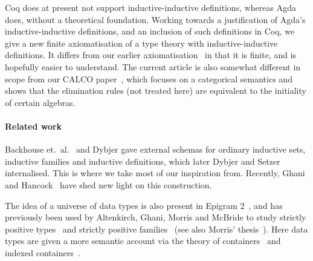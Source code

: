 \documentclass{schwicht}
\begin{document}
Coq does at present not support inductive-inductive
definitions, whereas Agda does, without a theoretical foundation.
Working towards a justification of Agda's inductive-inductive
definitions, and an inclusion of such definitions in Coq, we give a
new finite axiomatisation of a type theory with inductive-inductive
definitions. It differs from our earlier
axiomatisation~\cite{nordvallforsbergSetzer2010indind} in that it is
finite, and is hopefully easier to understand.  The current article is
also somewhat different in scope from our CALCO
paper~\cite{nordvallforsbergAltenkirchMorrisSetzer2011catsemindind},
which focuses on a categorical semantics and shows that the
elimination rules (not treated here) are equivalent to the initiality
of certain algebras.






\paragraph{Related work}
\label{sec:related-work}

Backhouse et.\ al.~\cite{backhouse1989diytt,backhouse1988meaning} and
Dybjer \cite{dybjer1994indfam,dybjer2000IR} gave external schemas for
ordinary inductive sets, inductive families and inductive definitions,
which later Dybjer and
Setzer~\cite{dybjersetzer1999finax,dybjersetzer2003inalg,dybjersetzer2006IIR}
internalised. This is where we take most of our inspiration from.
Recently, Ghani and Hancock~\cite{ghaniHancock2012algIR} have shed new
light on this construction.

The idea of a universe of data types is also present in Epigram
2~\cite{mcbride2010levitation}, and has previously been used by
Altenkirch, Ghani, Morris and McBride to study strictly positive
types~\cite{morrisAltenkirchMcBride2006regularTreeTypes} and strictly
positive families~\cite{morrisAltenkirchGhani2009SPFjournal} (see also
Morris' thesis~\cite{morris2007thesis}). Here data types are given a
more semantic account via the theory of
containers~\cite{abbottAltenkirchGhani2005containers} and indexed
containers~\cite{altenkirchMorris2009indexedCont}.
\end{document}
